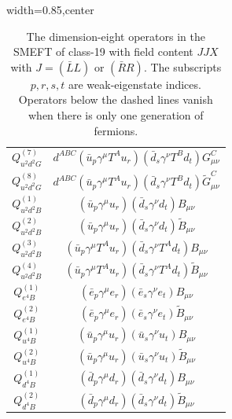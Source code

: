\begin{table}[H]
\begin{center}
\begin{adjustbox}{width=0.85\textwidth,center}
\begin{minipage}[t]{6.1cm}
\begin{tabular}[t]{c|c}
%
$Q_{u^2d^2G}^{(7)}$  &  $d^{ABC} (\bar u_p \gamma^\mu T^A u_r)(\bar d_s \gamma^\nu T^B d_t) G_{\mu\nu}^C$ \\
%
$Q_{u^2d^2G}^{(8)}$  &  $d^{ABC} (\bar u_p \gamma^\mu T^A u_r)(\bar d_s \gamma^\nu T^B d_t) \widetilde G_{\mu\nu}^C$ \\
%
$Q_{u^2d^2B}^{(1)}$  &  $(\bar u_p \gamma^\mu u_r)(\bar d_s \gamma^\nu d_t) B_{\mu\nu}$ \\
%
$Q_{u^2d^2B}^{(2)}$  &  $(\bar u_p \gamma^\mu u_r)(\bar d_s \gamma^\nu d_t) \widetilde B_{\mu\nu}$ \\
%
$Q_{u^2d^2B}^{(3)}$  &  $(\bar u_p \gamma^\mu T^A u_r)(\bar d_s \gamma^\nu T^A d_t) B_{\mu\nu}$ \\
%
$Q_{u^2d^2B}^{(4)}$  &  $(\bar u_p \gamma^\mu T^A u_r)(\bar d_s \gamma^\nu T^A d_t) \widetilde B_{\mu\nu}$ \\ \hdashline
%
$Q_{e^4B}^{(1)}$  &  $(\bar e_p \gamma^\mu e_r) (\bar e_s \gamma^\nu e_t) B_{\mu\nu}$ \\
%
$Q_{e^4B}^{(2)}$  &  $(\bar e_p \gamma^\mu e_r) (\bar e_s \gamma^\nu e_t) \widetilde B_{\mu\nu}$ \\
%
$Q_{u^4B}^{(1)}$  &  $(\bar u_p \gamma^\mu u_r) (\bar u_s \gamma^\nu u_t) B_{\mu\nu}$ \\
%
$Q_{u^4B}^{(2)}$  &  $(\bar u_p \gamma^\mu u_r) (\bar u_s \gamma^\nu u_t) \widetilde B_{\mu\nu}$ \\
%
$Q_{d^4B}^{(1)}$  & $(\bar d_p \gamma^\mu d_r) (\bar d_s \gamma^\nu d_t) B_{\mu\nu}$ \\
%
$Q_{d^4B}^{(2)}$  & $(\bar d_p \gamma^\mu d_r) (\bar d_s \gamma^\nu d_t) \widetilde B_{\mu\nu}$
\end{tabular}
\end{minipage}
\end{adjustbox}
\end{center}
\caption{The dimension-eight operators in the SMEFT of class-19 with field content $J J X$ with $J = (\bar L L)$ or $(\bar R R)$. 
The subscripts $p, r, s, t$ are weak-eigenstate indices.
Operators below the dashed lines vanish when there is only one generation of fermions.}
\label{tab:smeft8class_19_LL_RR}
\end{table}


